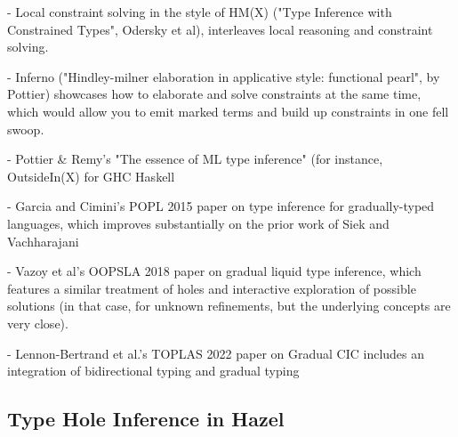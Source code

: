 
- Local constraint solving in the style of HM(X) ("Type Inference with Constrained Types", Odersky et al), interleaves local reasoning and constraint solving.

- Inferno ("Hindley-milner elaboration in applicative style: functional pearl", by Pottier) showcases how to elaborate and solve constraints at the same time, which would allow you to emit marked terms and build up constraints in one fell swoop.

- Pottier & Remy's "The essence of ML type inference" (for instance, OutsideIn(X) for GHC Haskell

- Garcia and Cimini's POPL 2015 paper on type inference for gradually-typed languages, which improves substantially on the prior work of Siek and Vachharajani

- Vazoy et al's OOPSLA 2018 paper on gradual liquid type inference, which features a similar treatment of holes and interactive exploration of possible solutions (in that case, for unknown refinements, but the underlying concepts are very close). 

- Lennon-Bertrand et al.'s TOPLAS 2022 paper on Gradual CIC includes an integration of bidirectional typing and gradual typing



\subsection{Type Hole Inference in Hazel}



